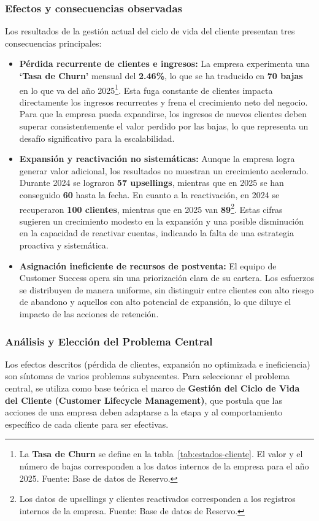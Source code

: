 \subsubsection{Efectos y consecuencias observadas}
Los resultados de la gestión actual del ciclo de vida del cliente presentan tres consecuencias principales:

\begin{itemize}
    \item \textbf{Pérdida recurrente de clientes e ingresos:} La empresa experimenta una \textbf{`Tasa de Churn'} mensual del \textbf{2.46\%}, lo que se ha traducido en \textbf{70 bajas} en lo que va del año 2025\footnote{La \textbf{Tasa de Churn} se define en la tabla~\ref{tab:estados-cliente}. El valor y el número de bajas corresponden a los datos internos de la empresa para el año 2025. Fuente: Base de datos de Reservo.}. Esta fuga constante de clientes impacta directamente los ingresos recurrentes y frena el crecimiento neto del negocio. Para que la empresa pueda expandirse, los ingresos de nuevos clientes deben superar consistentemente el valor perdido por las bajas, lo que representa un desafío significativo para la escalabilidad.

    \item \textbf{Expansión y reactivación no sistemáticas:} Aunque la empresa logra generar valor adicional, los resultados no muestran un crecimiento acelerado. Durante 2024 se lograron \textbf{57 upsellings}, mientras que en 2025 se han conseguido \textbf{60} hasta la fecha. En cuanto a la reactivación, en 2024 se recuperaron \textbf{100 clientes}, mientras que en 2025 van \textbf{89}\footnote{Los datos de upsellings y clientes reactivados corresponden a los registros internos de la empresa. Fuente: Base de datos de Reservo.}. Estas cifras sugieren un crecimiento modesto en la expansión y una posible disminución en la capacidad de reactivar cuentas, indicando la falta de una estrategia proactiva y sistemática.

    \item \textbf{Asignación ineficiente de recursos de postventa:} El equipo de Customer Success opera sin una priorización clara de su cartera. Los esfuerzos se distribuyen de manera uniforme, sin distinguir entre clientes con alto riesgo de abandono y aquellos con alto potencial de expansión, lo que diluye el impacto de las acciones de retención.
\end{itemize}

\subsubsection{Análisis y Elección del Problema Central}
Los efectos descritos (pérdida de clientes, expansión no optimizada e ineficiencia) son síntomas de varios problemas subyacentes. Para seleccionar el problema central, se utiliza como base teórica el marco de \textbf{Gestión del Ciclo de Vida del Cliente (Customer Lifecycle Management)}, que postula que las acciones de una empresa deben adaptarse a la etapa y al comportamiento específico de cada cliente para ser efectivas.

